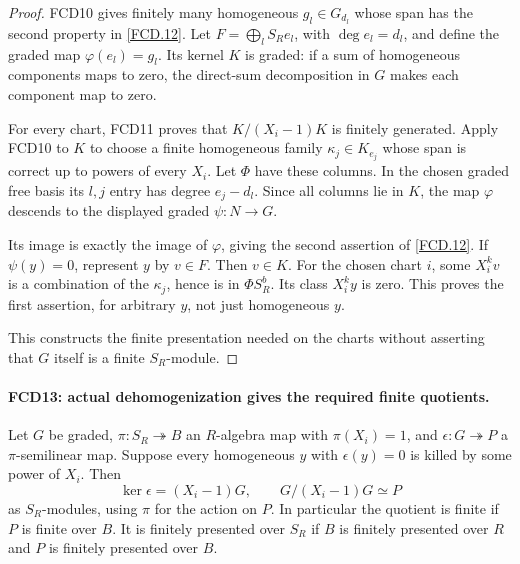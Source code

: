 \begin{proof}
FCD10 gives finitely many homogeneous $g_l\in G_{d_l}$ whose
span has the second property in \eqref{FCD.12}.  Let
$F=\bigoplus_lS_Re_l$, with $\deg e_l=d_l$, and define the
graded map $\varphi(e_l)=g_l$.  Its kernel $K$ is graded:
if a sum of homogeneous components maps to zero, the direct-sum
decomposition in $G$ makes each component map to zero.

For every chart, FCD11 proves that $K/(X_i-1)K$ is finitely
generated.  Apply FCD10 to $K$ to choose a finite homogeneous
family $\kappa_j\in K_{e_j}$ whose span is correct up to powers
of every $X_i$.  Let $\Phi$ have these columns.  In the chosen
graded free basis its $l,j$ entry has degree $e_j-d_l$.
Since all columns lie in $K$, the map $\varphi$ descends to the
displayed graded $\psi:N\to G$.

Its image is exactly the image of $\varphi$, giving the second
assertion of \eqref{FCD.12}.  If $\psi(y)=0$, represent $y$
by $v\in F$.  Then $v\in K$.  For the chosen chart $i$, some
$X_i^kv$ is a combination of the $\kappa_j$, hence is in
$\Phi S_R^b$.  Its class $X_i^ky$ is zero.  This proves the
first assertion, for arbitrary $y$, not just homogeneous $y$.

This constructs the finite presentation needed on the charts without
asserting that $G$ itself is a finite $S_R$-module.
\end{proof}

\paragraph{FCD13: actual dehomogenization gives the required finite quotients.}
\label{claim:FCD13}
Let $G$ be graded, $\pi:S_R\twoheadrightarrow B$ an
$R$-algebra map with $\pi(X_i)=1$, and
$\epsilon:G\twoheadrightarrow P$ a $\pi$-semilinear map.
Suppose every homogeneous $y$ with $\epsilon(y)=0$ is killed
by some power of $X_i$.  Then
\[
 \ker\epsilon=(X_i-1)G,
 \qquad G/(X_i-1)G\simeq P                          \tag{FCD.13}\label{FCD.13}
\]
as $S_R$-modules, using $\pi$ for the action on $P$.
In particular the quotient is finite if $P$ is finite over $B$.
It is finitely presented over $S_R$ if $B$ is finitely presented
over $R$ and $P$ is finitely presented over $B$.

